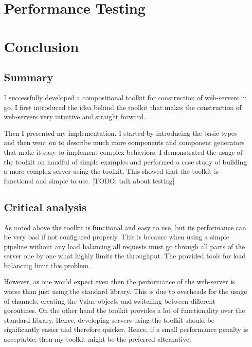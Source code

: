 \documentclass[12pt,a4paper]{article}
\begin{document}
\newpage
\section{Performance Testing}
\label{sec:test}
\newpage
\section{Conclusion}
\label{sec:conclusion}
\subsection{Summary}
I successfully developed a compositional toolkit for construction of 
web-servers in go. I first introduced the idea behind the toolkit that 
makes the construction of web-servers very intuitive and straight forward. 

Then I presented my implementation. I started by introducing the basic types
and then went on to describe much more components and component generators
that make it easy to implement complex behaviors. I demonstrated the usage of the 
toolkit on handful of simple examples and performed a case study of building
a more complex server using the toolkit. This showed that the toolkit is
functional and simple to use. [TODO: talk about testing] 

\subsection{Critical analysis}
As noted above the toolkit is functional and easy to use, but its performance
can be very bad if not configured properly. This is because when using a simple
pipeline without any load balancing all requests must go through all parts
of the server one by one what highly limits the throughput. The provided
tools for load balancing limit this problem.

However, as one would expect even then the performance of the web-server
is worse than just using the standard library. This is due to overheads
for the usage of channels, creating the Value objects
and switching between different goroutines.
On the other hand the toolkit provides a lot of functionality over the
standard library. Hence, developing servers using the toolkit should be
significantly easier and therefore quicker. Hence, if a small performance
penalty is acceptable, then my toolkit might be the preferred alternative.
\end{document}
